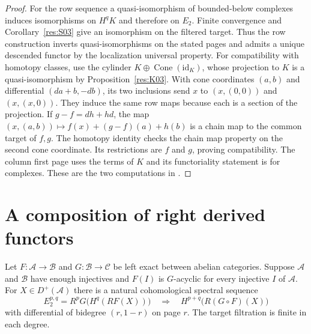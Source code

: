 \begin{proof}
For the row sequence a quasi-isomorphism of bounded-below complexes
induces isomorphisms on \(H^q K\) and therefore on \(E_2\).
Finite convergence and Corollary~\ref{res:S03} give an isomorphism
on the filtered target. Thus the row construction inverts
quasi-isomorphisms on the stated pages and admits a unique
descended functor by the localization universal property.
For compatibility with homotopy classes, use the cylinder
\(K\oplus\operatorname{Cone}(\mathrm{id}_K)\), whose projection to
\(K\) is a quasi-isomorphism by Proposition~\ref{res:K03}. With cone
coordinates \((a,b)\) and differential \((da+b,-db)\), its two
inclusions send \(x\) to \((x,(0,0))\) and \((x,(x,0))\).
They induce the same row maps because each is a section of
the projection. If \(g-f=dh+hd\), the map
\((x,(a,b))\mapsto f(x)+(g-f)(a)+h(b)\) is a chain map to the
common target of \(f,g\). The homotopy identity checks the
chain map property on the second cone coordinate. Its
restrictions are \(f\) and \(g\), proving compatibility.
The column first page uses the terms of \(K\) and its
functoriality statement is for complexes. These are the two computations in
\cite[Tags 015J and 015K]{stacks-derived}.
\end{proof}

\section{A composition of right derived functors}

\begin{theorem}
\label{res:G04}
Let \(F:\mathcal A\to\mathcal B\) and \(G:\mathcal B\to\mathcal C\)
be left exact between abelian categories. Suppose \(\mathcal A\) and
\(\mathcal B\) have enough injectives and \(F(I)\) is \(G\)-acyclic
for every injective \(I\) of \(\mathcal A\). For \(X\in D^+(\mathcal A)\)
there is a natural cohomological spectral sequence
\[
      E_2^{p,q}=R^pG\bigl(H^q(RF(X))\bigr)
      \quad\Longrightarrow\quad
      H^{p+q}\bigl(R(G\circ F)(X)\bigr)
\]
with differential of bidegree \((r,1-r)\) on page \(r\).
The target filtration is finite in each degree.
\end{theorem}

